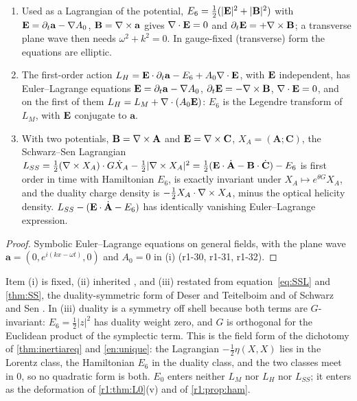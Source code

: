 \begin{proposition}
\label{r1:prop:E6}
\begin{enumerate}[label=(\roman*),leftmargin=2.2em]
\item Used as a Lagrangian of the potential, $E_6=\tfrac12(|\mathbf E|^2+|\mathbf B|^2)$ with $\mathbf E=\partial_t\mathbf a-\nabla A_0$, $\mathbf B=\nabla\times\mathbf a$
gives $\nabla\cdot\mathbf E=0$ and $\partial_t\mathbf E=+\nabla\times\mathbf B$; a transverse plane wave then needs $\omega^2+k^2=0$. In gauge-fixed (transverse)
form the equations are elliptic.
\item The first-order action $L_H=\mathbf E\cdot\partial_t\mathbf a-E_6+A_0\nabla\cdot\mathbf E$, with $\mathbf E$ independent, has Euler--Lagrange equations
$\mathbf E=\partial_t\mathbf a-\nabla A_0$, $\partial_t\mathbf E=-\nabla\times\mathbf B$, $\nabla\cdot\mathbf E=0$, and on the first of them
$L_H=L_M+\nabla\cdot(A_0\mathbf E)$: $E_6$ is the Legendre transform of $L_M$, with $\mathbf E$ conjugate to $\mathbf a$.
\item With two potentials, $\mathbf B=\nabla\times\mathbf A$ and $\mathbf E=\nabla\times\mathbf C$, $X_A=(\mathbf A;\mathbf C)$, the Schwarz--Sen Lagrangian
$L_{SS}=\tfrac12(\nabla\times X_A)\cdot G\dot X_A-\tfrac12|\nabla\times X_A|^2=\tfrac12(\mathbf E\cdot\dot{\mathbf A}-\mathbf B\cdot\dot{\mathbf C})-E_6$ is first order in
time with Hamiltonian $E_6$, is exactly invariant under $X_A\mapsto e^{\theta G}X_A$, and the duality charge density is
$-\tfrac12X_A\cdot\nabla\times X_A$, minus the optical helicity density. $L_{SS}-(\mathbf E\cdot\dot{\mathbf A}-E_6)$ has identically vanishing
Euler--Lagrange expression.
\end{enumerate}
\end{proposition}

\begin{proof}
Symbolic Euler--Lagrange equations on general fields, with the plane wave $\mathbf a=(0,e^{i(kx-\omega t)},0)$ and $A_0=0$ in (i)
(r1-30, r1-31, r1-32).
\end{proof}

Item (i) is fixed, (ii) inherited \cite{HenneauxTeitelboim92}, and (iii) restated from equation~\cref{eq:SSL} and \cref{thm:SS}, the
duality-symmetric form of Deser and Teitelboim and of Schwarz and Sen \cite{DeserTeitelboim76,SchwarzSen94}. In (iii) duality is a symmetry
off shell because both terms are $G$-invariant: $E_6=\tfrac12|z|^2$ has duality weight zero, and $G$ is orthogonal for the Euclidean product
of the symplectic term. This is the field form of the dichotomy of \cref{thm:inertiareq} and \cref{en:unique}: the Lagrangian
$-\tfrac12\eta(X,X)$ lies in the Lorentz class, the Hamiltonian $E_6$ in the duality class, and the two classes meet in $0$, so no quadratic
form is both. $E_0$ enters neither $L_M$ nor $L_H$ nor $L_{SS}$; it enters as the deformation of \cref{r1:thm:L0}(v) and of
\cref{r1:prop:ham}.


